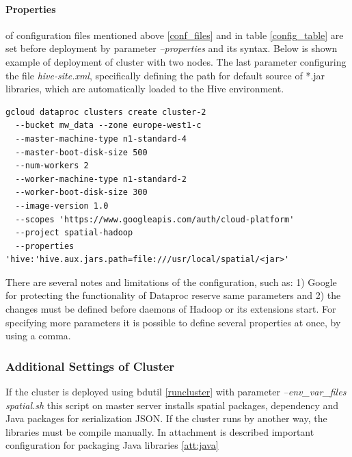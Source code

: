 \documentclass[a4paper,12pt,oneside]{report}
\begin{document}
	\paragraph{Properties} of configuration files mentioned above \ref{conf_files}
	and in table \ref{config_table} are set before deployment by parameter
	\textit{--properties} and its syntax. Below is shown example of deployment of cluster
	with two nodes. The last parameter configuring the file \textit{hive-site.xml}, 
	specifically defining the path for default source of *.jar libraries, which are
	automatically loaded to the Hive environment. \cite{gcloud_dataproc}
	\begin{footnotesize}
		\begin{lstlisting}[style=python]
gcloud dataproc clusters create cluster-2 
  --bucket mw_data --zone europe-west1-c
  --master-machine-type n1-standard-4 
  --master-boot-disk-size 500 
  --num-workers 2
  --worker-machine-type n1-standard-2 
  --worker-boot-disk-size 300 
  --image-version 1.0 
  --scopes 'https://www.googleapis.com/auth/cloud-platform' 
  --project spatial-hadoop
  --properties 'hive:'hive.aux.jars.path=file:///usr/local/spatial/<jar>'
		\end{lstlisting}
	\end{footnotesize}
    There are several notes and limitations  of the configuration, such as: 1)
    Google for protecting the functionality of Dataproc reserve same parameters and 2) the
    changes must be defined before daemons of Hadoop or its extensions start. For
    specifying more parameters it is possible to define several properties at once, by
    using a comma.

	\subsubsection{Additional Settings of Cluster}
	If the cluster is deployed using bdutil \ref{runcluster}  with parameter
	\textit{--env\_var\_files spatial.sh} this script on master server installs
	spatial packages, dependency and Java packages for serialization JSON. If the
	cluster runs by another way, the libraries must be compile manually. In attachment is described important configuration for packaging Java libraries \ref{att:java}
\end{document}
